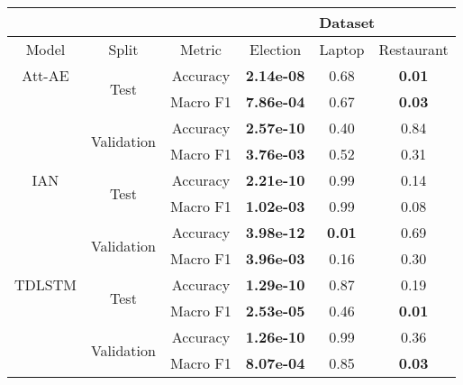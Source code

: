 \begin{tabular}{|c|c|c|c|c|c|}       
\hline
&            &  & \multicolumn{3}{c|}{Dataset} \\
\hline
Model & Split & Metric &      Election         &    Laptop       &  Restaurant           \\
\hline
Att-AE & \multirow{2}{*}{Test} & Accuracy &  \textbf{2.14e-08} &  0.68 &    \textbf{0.01} \\
&            & Macro F1 &  \textbf{7.86e-04} &  0.67 &    \textbf{0.03} \\
& \multirow{2}{*}{Validation} & Accuracy &  \textbf{2.57e-10} &  0.40 &    0.84 \\
&            & Macro F1 &  \textbf{3.76e-03} &  0.52 &    0.31 \\
\hline
IAN & \multirow{2}{*}{Test} & Accuracy &  \textbf{2.21e-10} &  0.99 &    0.14 \\
&            & Macro F1 &  \textbf{1.02e-03} &  0.99 &    0.08 \\
& \multirow{2}{*}{Validation} & Accuracy &  \textbf{3.98e-12} &  \textbf{0.01} &    0.69 \\
&            & Macro F1 &  \textbf{3.96e-03} &  0.16 &    0.30 \\
\hline
TDLSTM & \multirow{2}{*}{Test} & Accuracy &  \textbf{1.29e-10} &  0.87 &    0.19 \\
&            & Macro F1 &  \textbf{2.53e-05} &  0.46 &    \textbf{0.01} \\       
& \multirow{2}{*}{Validation} & Accuracy &  \textbf{1.26e-10} &  0.99 &    0.36 \\
&            & Macro F1 &  \textbf{8.07e-04} &  0.85 &    \textbf{0.03} \\
\hline
\end{tabular}